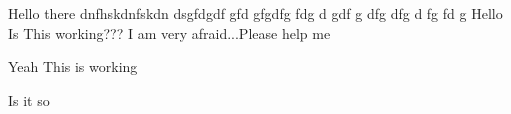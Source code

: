 \documentclass[12pt, a4paper]{article}
\begin{document}
Hello there
dnfhskdnfskdn
dsgfdgdf
gfd
gfgdfg
fdg
d
gdf
g
dfg
dfg
d
fg
fd
g
Hello Is This working???
I am very afraid...Please help me

Yeah This is working


Is it so
\end{document}
